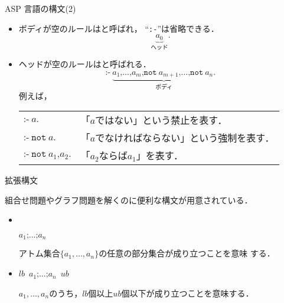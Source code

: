 \begin{frame}{ASP 言語の構文(2)}
\begin{itemize}
\item ボディが空のルールはと呼ばれ，
  ``\texttt{:-}''は省略できる．
  \[
    \underbrace{a_0}_{\textrm{ヘッド}}\texttt{.}
  \]
\item ヘッドが空のルールはと呼ばれる．
  \[
    \texttt{:-}\
    \underbrace{a_1\texttt{,}\dots\texttt{,}a_m\texttt{,}
      \texttt{not}\ {a_{m+1}}\texttt{,}\dots\texttt{,}
      \texttt{not}\ {a_n}\texttt{.}}_{\textrm{ボディ}}
  \]
  例えば，\\[1em]
  \begin{tabular}[t]{l|l}
    \(\texttt{:-}\ a\texttt{.}\) &
   「$a$ではない」という禁止を表す．\\
    \(\texttt{:-}\ \texttt{not}\ a\texttt{.}\) &
   「$a$でなければならない」という強制を表す．\\
    \(\texttt{:-}\ \texttt{not}\ a_1\texttt{,} {a_{2}}\texttt{.}\)&
  「$a_2$ならば$a_1$」を表す．
  \end{tabular}
\end{itemize}
\end{frame}
\begin{frame}[shrink]{拡張構文}
\begin{alertblock}{}\centering
  組合せ問題やグラフ問題を解くのに便利な構文が用意されている．
\end{alertblock}

\begin{itemize}
\item {}\\
  \begin{center}
   \code{\{}\(a_1\texttt{;}\dots\texttt{;}a_n\)\\
  \end{center}
  アトム集合\(\{a_1,\dots,a_n\}\)の任意の部分集合が成り立つことを意味
  する．
\item {}
  \begin{center}
   $lb$\ \code{\{}\(a_1\texttt{;}\dots\texttt{;}a_n\)\code{\}}\ $ub$
  \end{center}
  $a_1,\dots,a_n$のうち，$lb$個以上$ub$個以下が成り立つことを意味する．
\end{itemize}
\end{frame}
\backupend

